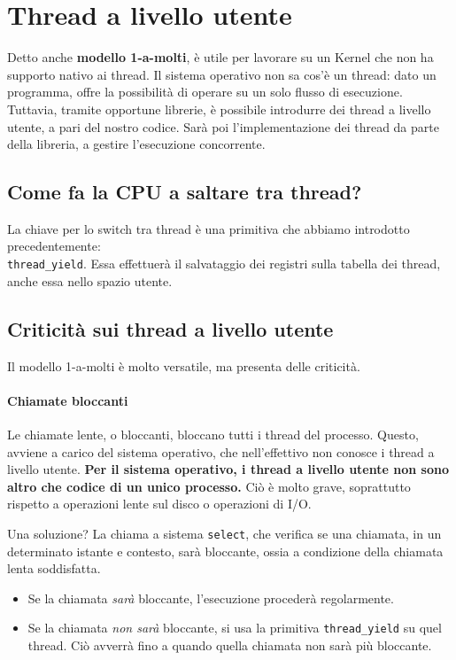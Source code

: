 \documentclass{report}
\begin{document}
\newpage

\section{Thread a livello utente}
Detto anche \textbf{modello 1-a-molti}, è utile per lavorare su un Kernel che non ha supporto nativo ai thread. Il sistema operativo non sa cos'è un thread: dato un programma, offre la possibilità di operare su un solo flusso di esecuzione. Tuttavia, tramite opportune librerie, è possibile introdurre dei thread a livello utente, a pari del nostro codice. Sarà poi l'implementazione dei thread da parte della libreria, a gestire l'esecuzione concorrente. 

\subsection{Come fa la CPU a saltare tra thread?}
La chiave per lo switch tra thread è una primitiva che abbiamo introdotto precedentemente:\\ \verb|thread_yield|. Essa effettuerà il salvataggio dei registri sulla tabella dei thread, anche essa nello spazio utente.

\subsection{Criticità sui thread a livello utente}
Il modello 1-a-molti è molto versatile, ma presenta delle criticità.

\paragraph{Chiamate bloccanti}
Le chiamate lente, o bloccanti, bloccano tutti i thread del processo. Questo, avviene a carico del sistema operativo, che nell'effettivo non conosce i thread a livello utente. \textbf{Per il sistema operativo, i thread a livello utente non sono altro che codice di un unico processo.} Ciò è molto grave, soprattutto rispetto a operazioni lente sul disco o operazioni di I/O.

Una soluzione?  La chiama a sistema \verb|select|, che verifica se una chiamata, in un determinato istante e contesto, sarà bloccante, ossia a condizione della chiamata lenta soddisfatta.

\begin{itemize}
    \item Se la chiamata \textit{sarà} bloccante, l'esecuzione procederà regolarmente.
    \item Se la chiamata \textit{non sarà} bloccante, si usa la primitiva \verb|thread_yield| su quel thread. Ciò avverrà fino a quando quella chiamata non sarà più bloccante.
\end{itemize}
\end{document}
